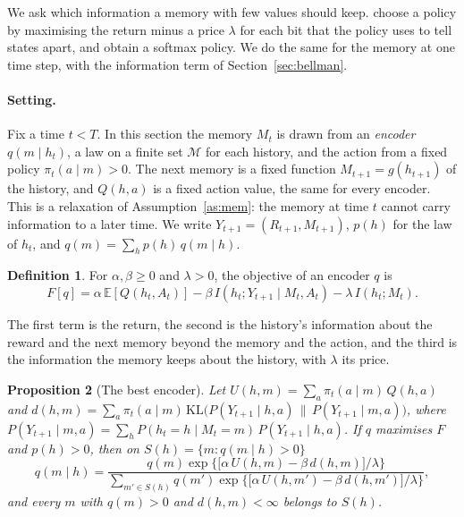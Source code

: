 \documentclass{article}
\newtheorem{proposition}{Proposition}[section]
\theoremstyle{definition}
\newtheorem{definition}[proposition]{Definition}
\theoremstyle{remark}
\newcommand{\E}{\mathbb{E}}
\newcommand{\KL}{\mathrm{KL}}
\begin{document}
We ask which information a memory with few values should keep. \citet{still2012information} choose a policy by maximising the return minus a price $\lambda$ for each bit that the policy uses to tell states apart, and obtain a softmax policy. We do the same for the memory at one time step, with the information term of Section~\ref{sec:bellman}.

\paragraph{Setting.} Fix a time $t<T$. In this section the memory $M_t$ is drawn from an \emph{encoder} $q(m\mid h_t)$, a law on a finite set $\mathcal M$ for each history, and the action from a fixed policy $\pi_t(a\mid m)>0$. The next memory is a fixed function $M_{t+1}=g(h_{t+1})$ of the history, and $Q(h,a)$ is a fixed action value, the same for every encoder. This is a relaxation of Assumption~\ref{as:mem}: the memory at time $t$ cannot carry information to a later time. We write $Y_{t+1}=(R_{t+1},M_{t+1})$, $p(h)$ for the law of $h_t$, and $q(m)=\sum_hp(h)\,q(m\mid h)$.

\begin{definition}\label{def:objective}
For $\alpha,\beta\ge0$ and $\lambda>0$, the objective of an encoder $q$ is
\[
F[q]=\alpha\,\E[Q(h_t,A_t)]-\beta\,I(h_t;Y_{t+1}\mid M_t,A_t)-\lambda\,I(h_t;M_t).
\]
\end{definition}

The first term is the return, the second is the history's information about the reward and the next memory beyond the memory and the action, and the third is the information the memory keeps about the history, with $\lambda$ its price.

\begin{proposition}[The best encoder]\label{prop:encoder}
Let $U(h,m)=\sum_a\pi_t(a\mid m)\,Q(h,a)$ and $d(h,m)=\sum_a\pi_t(a\mid m)\,\KL\big(P(Y_{t+1}\mid h,a)\,\|\,P(Y_{t+1}\mid m,a)\big)$, where $P(Y_{t+1}\mid m,a)=\sum_hP(h_t=h\mid M_t=m)\,P(Y_{t+1}\mid h,a)$. If $q$ maximises $F$ and $p(h)>0$, then on $S(h)=\{m:q(m\mid h)>0\}$
\[
q(m\mid h)=\frac{q(m)\exp\big\{\big[\alpha\,U(h,m)-\beta\,d(h,m)\big]/\lambda\big\}}{\sum_{m'\in S(h)}q(m')\exp\big\{\big[\alpha\,U(h,m')-\beta\,d(h,m')\big]/\lambda\big\}},
\]
and every $m$ with $q(m)>0$ and $d(h,m)<\infty$ belongs to $S(h)$.
\end{proposition}
\end{document}
